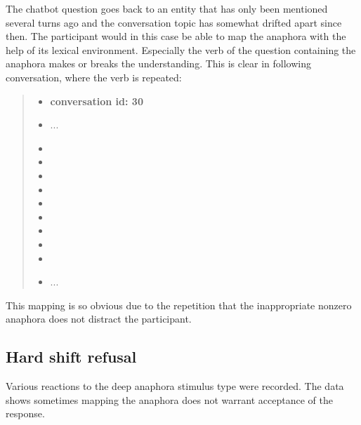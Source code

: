     The chatbot question goes back to an entity that has only been mentioned several turns ago
    and the conversation topic has somewhat drifted apart since then.
    The participant would in this case be able to map the anaphora with the help of its lexical environment.
    Especially the verb of the question containing the anaphora makes or breaks the understanding.
    This is clear in following conversation, where the verb is repeated:

    \begin{quote}
    \begin{itemize}[label={}, leftmargin=0pt, itemsep=0.5em]
    \item \textbf{conversation id: 30}
    \item ...
     \item {}
     \item {}
     \item {}
     \item {}
     \item {}
     \item {}
     \item {}
     \item {}
     \item {}
    \item ...
    \end{itemize}
    \end{quote}

    This mapping is so obvious due to the repetition that
    the inappropriate nonzero anaphora does not distract the participant.

\subsection{Hard shift refusal}

    Various reactions to the deep anaphora stimulus type were recorded.
    The data shows sometimes mapping the anaphora does not warrant acceptance of the response.

